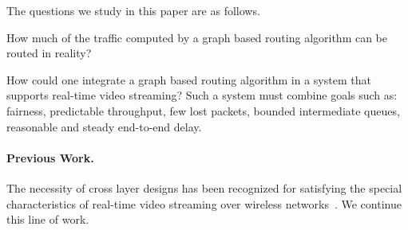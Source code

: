 \documentclass[12pt]{article}
\newenvironment{proof sketch}[1]{\noindent {\emph{Proof sketch of #1:}}}{\hfill \qed}
\newcommand{\SNR}{\text{\sc{snr}}}
\newcommand{\MCS}{\text{\sc{mcs}}}
\begin{document}
The questions we study in this paper are as follows.
\begin{inparaenum}[(i)]
\item How much of the traffic computed by a graph based routing
  algorithm can be routed in reality?
\item How could one integrate a graph based routing algorithm in a
  system that supports real-time video streaming? Such a system must
  combine goals such as: fairness, predictable throughput, few lost
  packets, bounded intermediate queues, reasonable and steady
  end-to-end delay.
\end{inparaenum}

\paragraph{Previous Work.}
The necessity of cross layer designs has been recognized for
satisfying the special characteristics of real-time video streaming
over wireless
networks~\cite{shan2005cross,setton2005cross,khan2006application}.  We
continue this line of work.

\end{document}
